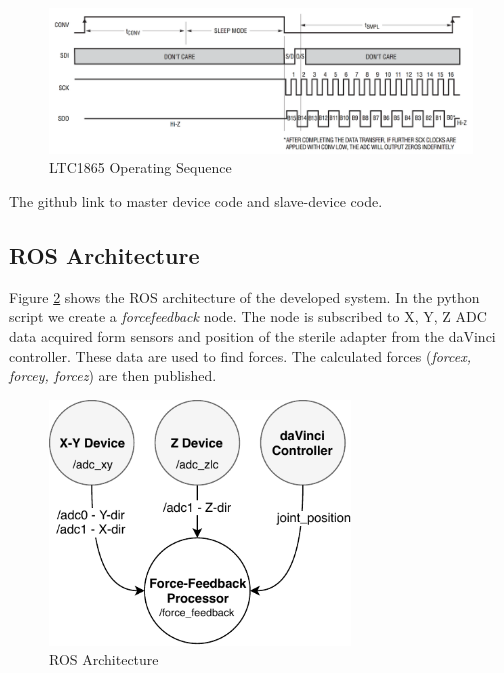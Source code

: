 \begin{figure}[h]
	\begin{center}
		\includegraphics[width=140mm]{fig/methods/SPI_communication.png}
	\end{center}
	\vspace{-4mm}
	\caption[ADC LTC1865 Operating Sequence]
	{LTC1865 Operating Sequence \cite{ltc1865}}
	\label{fig:SPI_com}
	\vspace{-2mm}
\end{figure}

The github link to master device code and slave-device code.

	\subsection{ROS Architecture}
	\label{sec:p2}
Figure \ref{fig:ROS_arch} shows the ROS architecture of the developed system. In the python script we create a \textit{force\textunderscore feedback} node. The node is subscribed to X, Y, Z ADC data acquired form sensors and position of the sterile adapter from the daVinci controller. These data are used to find forces. The calculated forces (\textit{force\textunderscore x, force\textunderscore y, force\textunderscore z}) are then published.
\begin{figure}[h]
	\begin{center}
		\includegraphics[width=80mm]{fig/methods/ROS_architecture.pdf}
	\end{center}
	\vspace{-4mm}
	\caption[ROS Architecture]
	{ROS Architecture}
	\label{fig:ROS_arch}
	\vspace{-2mm}
\end{figure}	

